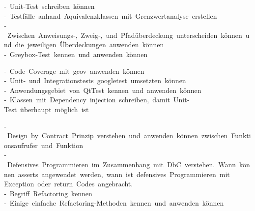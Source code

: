 ‐ Unit‐Test schreiben können \\
‐ Testfälle anhand Aquivalenzklassen mit Grenzwertanalyse erstellen \\
‐ Zwischen Anweisungs‐, Zweig‐, und Pfadüberdeckung unterscheiden können und die jeweiligen Überdeckungen anwenden können \\
‐ Greybox‐Test kennen und anwenden können

‐ Code Coverage mit gcov anwenden können \\
‐ Unit‐ und Integrationstests googletest umsetzten können \\
‐ Anwendungsgebiet von QtTest kennen und anwenden können \\
‐ Klassen mit Dependency injection schreiben, damit Unit‐Test überhaupt möglich ist

‐ Design by Contract Prinzip verstehen und anwenden können zwischen Funktionsaufrufer und Funktion \\
‐ Defensives Programmieren im Zusammenhang mit DbC verstehen. Wann können asserts angewendet werden, wann ist defensives Programmieren mit 
Exception oder return Codes angebracht. \\
‐ Begriff Refactoring kennen \\
‐ Einige einfache Refactoring‐Methoden kennen und anwenden können